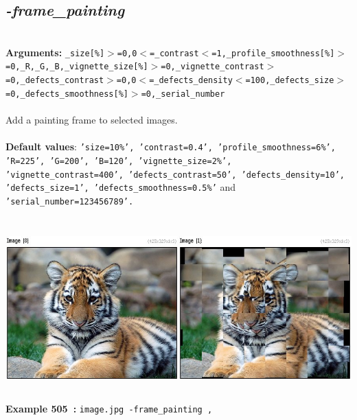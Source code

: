 \documentclass[a4paper,11pt,twoside]{book}
\begin{document}
\subsection{\emph{-frame\_painting} }\vspace*{-0.5em}
~\\\textbf{Arguments: } 
{\small \texttt{\_size[\%]$>$=0,0$<$=\_contrast$<$=1,\_profile\_smoothness[\%]$>$=0,\_R,\_G,\_B,\_vignette\_size[\%]$>$=0,\_vignette\_contrast$>$=0,\_defects\_contrast$>$=0,0$<$=\_defects\_density$<$=100,\_defects\_size$>$=0,\_defects\_smoothness[\%]$>$=0,\_serial\_number}}\\~\\
Add a painting frame to selected images.
~\\~\\\textbf{Default values}: {\small \texttt{'size=10\%', 'contrast=0.4', 'profile\_smoothness=6\%', 'R=225', 'G=200', 'B=120', 'vignette\_size=2\%', 'vignette\_contrast=400', 'defects\_contrast=50', 'defects\_density=10', 'defects\_size=1', 'defects\_smoothness=0.5\%'} and \texttt{'serial\_number=123456789'.}}
\begin{center}\includegraphics[keepaspectratio=true,height=7cm,width=\textwidth]{img/gmic_def505.jpg}\\
{\footnotesize \textbf{Example 505~:} \texttt{image.jpg -frame\_painting ,}}
\end{center}
\end{document}
